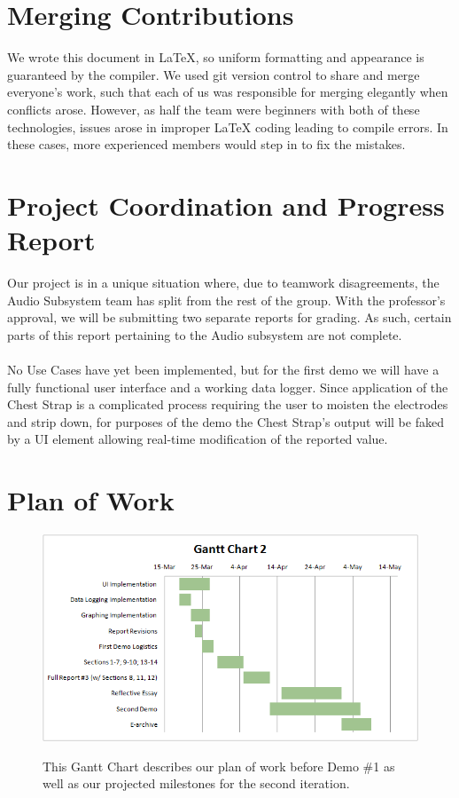 \documentclass[letterpaper,english, 12pt]{scrreprt}
\begin{document}
\section{Merging Contributions}
We wrote this document in \LaTeX, so uniform formatting and appearance is guaranteed by the compiler.
We used git version control to share and merge everyone's work, such that each of us was responsible for merging elegantly when conflicts arose.
However, as half the team were beginners with both of these technologies, issues arose in improper LaTeX coding leading to compile errors.
In these cases, more experienced members would step in to fix the mistakes.

\section{Project Coordination and Progress Report}
Our project is in a unique situation where, due to teamwork disagreements, the Audio Subsystem team has split from the rest of the group.
With the professor's approval, we will be submitting two separate reports for grading.
As such, certain parts of this report pertaining to the Audio subsystem are not complete.
\\
\\
No Use Cases have yet been implemented, but for the first demo we will have a fully functional user interface and a working data logger.
Since application of the Chest Strap is a complicated process requiring the user to moisten the electrodes and strip down, for purposes of the demo the Chest Strap's output will be faked by a UI element allowing real-time modification of the reported value.

\section{Plan of Work}
\begin{figure}[H]
	\centering
	\includegraphics{img/Gantt_Chart2.png}\\
	\caption{This Gantt Chart describes our plan of work before Demo \#1 as well as our projected milestones for the second iteration.}
\end{figure}
\end{document}
